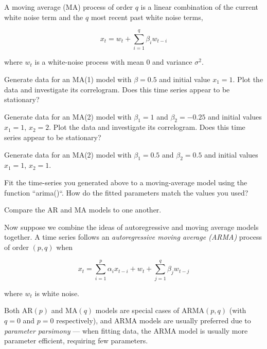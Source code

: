 \vspace{5mm}

\noindent
A moving average (MA) process of order $q$ is a linear combination of
the current white noise term and the $q$ most recent past white noise
terms,

\begin{equation}
x_t = w_t + \sum^q_{i=1} \beta_i w_{t - i}
\end{equation}

\noindent
where $w_t$ is a white-noise process with mean 0 and variance $\sigma^2$.


Generate data for an MA(1) model with $\beta = 0.5$ and initial value
$x_1 = 1$. Plot the data and investigate its correlogram. Does this
time series appear to be stationary?


Generate data for an MA(2) model with $\beta_1 = 1$ and
$\beta_2 = -0.25$ and initial values $x_1 = 1$, $x_2 = 2$. Plot the
data and investigate its correlogram. Does this time series appear to
be stationary?


Generate data for an MA(2) model with $\beta_1 = 0.5$ and
$\beta_2 = 0.5$ and initial values $x_1 = 1$, $x_2 = 1$.


Fit the time-series you generated above to a moving-average model
using the function ``arima()``. How do the fitted parameters
match the values you used?


Compare the AR and MA models to one another.





\noindent
Now suppose we combine the ideas of autoregressive and moving average
models together. A time series follows an
\emph{autoregressive moving average (ARMA)} process of order $(p, q)$
when

\begin{equation}
x_t = \sum_{i=1}^p \alpha_i x_{t-i} + w_t + \sum_{j=1}^q \beta_j w_{t-j}
\end{equation}

\noindent
where $w_t$ is white noise.

Both $\text{AR}(p)$ and $\text{MA}(q)$ models are special cases of
$\text{ARMA}(p, q)$ (with $q = 0$ and $p = 0$ respectively), and ARMA
models are usually preferred due to \emph{parameter parsimony} ---
when fitting data, the ARMA model is usually more parameter efficient,
requiring few parameters.



